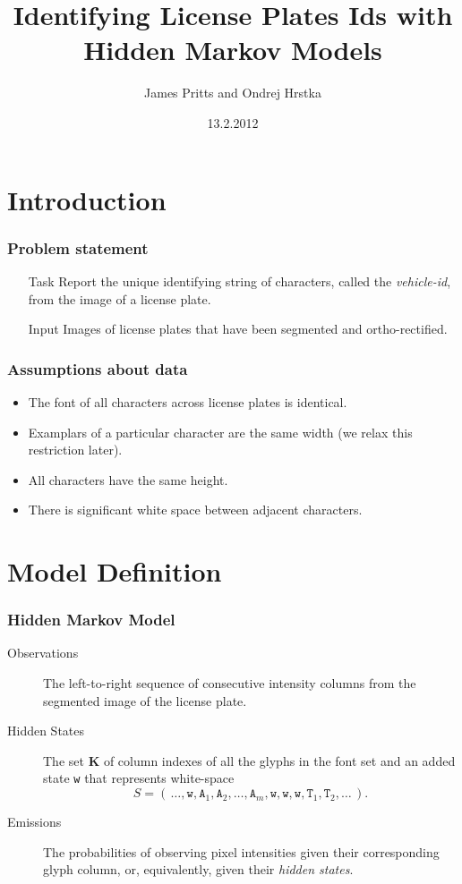 \documentclass{beamer}
\title{Identifying License Plates Ids with Hidden Markov
    Models}
\author{ James Pritts and Ondrej Hrstka }
\institute[CTU FEE]{Czech Technical University in Prague - Faculty of Electrical Engineering}
\date{13.2.2012}
\begin{document}
\begin{frame}
  \titlepage
\end{frame}


\section{Introduction}

\begin{frame}
  \frametitle{Problem statement}

\begin{itemize}
\item[Task] Report the unique identifying string of characters, called
  the \emph{vehicle-id}, from the image of a license plate.

\item[Input] Images of license plates that have been segmented and
  ortho-rectified.
\end{itemize}

\end{frame}

\begin{frame}
  \frametitle{Assumptions about data}
\begin{itemize}
\item The font of all characters across license plates is identical.
\item Examplars of a particular character are the same width (we relax this restriction later).
\item All characters have the same height.
\item There is significant white space between adjacent characters.
\end{itemize}
\end{frame}

\section{Model Definition}
\begin{frame}
  \frametitle{Hidden Markov Model}
\begin{description}
\item[Observations] The left-to-right sequence of consecutive intensity columns from
  the segmented image of the license plate.

\item[Hidden States] The set $\mathbf{K}$ of column
  indexes of all the glyphs in the font set and an added state \texttt{w}
  that represents white-space
\[S =
\left(\,\dots,\texttt{w},\texttt{A}_1,\texttt{A}_2,\ldots,\texttt{A}_{m},\texttt{w},\texttt{w},\texttt{w},\texttt{T}_1,\texttt{T}_2,\ldots\,\right).\]

\item[Emissions] The probabilities of observing pixel
  intensities given their corresponding glyph column, or,
  equivalently, given their \emph{hidden states}.

\end{description}
\end{frame}
\end{document}
